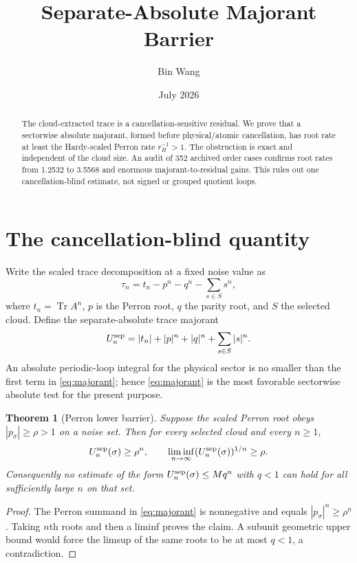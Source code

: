 \documentclass[11pt]{article}
\title{Separate-Absolute Majorant Barrier}
\author{Bin Wang}
\date{July 2026}
\newtheorem{theorem}{Theorem}
\newcommand{\Tr}{\operatorname{Tr}}
\begin{document}
\maketitle

\begin{abstract}
The cloud-extracted trace is a cancellation-sensitive residual.  We prove
that a sectorwise absolute majorant, formed before physical/atomic
cancellation, has root rate at least the Hardy-scaled Perron rate
$r_H^{-1}>1$.  The obstruction is exact and independent of the cloud size.
An audit of 352 archived order cases confirms root rates from 1.2532 to
3.5568 and enormous majorant-to-residual gains.  This rules out one
cancellation-blind estimate, not signed or grouped quotient loops.
\end{abstract}

\section{The cancellation-blind quantity}

Write the scaled trace decomposition at a fixed noise value as
\[
 \tau_n=t_n-p^n-q^n-\sum_{s\in S}s^n,
\]
where $t_n=\Tr A^n$, $p$ is the Perron root, $q$ the parity root, and $S$ the
selected cloud.  Define the separate-absolute trace majorant
\begin{equation}\label{eq:majorant}
 U_n^{\rm sep}=|t_n|+|p|^n+|q|^n+\sum_{s\in S}|s|^n.
\end{equation}
An absolute periodic-loop integral for the physical sector is no smaller
than the first term in \eqref{eq:majorant}; hence \eqref{eq:majorant} is the
most favorable sectorwise absolute test for the present purpose.

\begin{theorem}[Perron lower barrier]\label{thm:barrier}
Suppose the scaled Perron root obeys $|p_\sigma|\ge\rho>1$ on a noise set.
Then for every selected cloud and every $n\ge1$,
\[
 U_n^{\rm sep}(\sigma)\ge\rho^n,
 \qquad
 \liminf_{n\to\infty}(U_n^{\rm sep}(\sigma))^{1/n}\ge\rho.
\]
Consequently no estimate of the form
$U_n^{\rm sep}(\sigma)\le Mq^n$ with $q<1$ can hold for all sufficiently
large $n$ on that set.
\end{theorem}

\begin{proof}
The Perron summand in \eqref{eq:majorant} is nonnegative and equals
$|p_\sigma|^n\ge\rho^n$.  Taking $n$th roots and then a liminf proves the
claim.  A subunit geometric upper bound would force the limsup of the same
roots to be at most $q<1$, a contradiction.
\end{proof}
\end{document}
